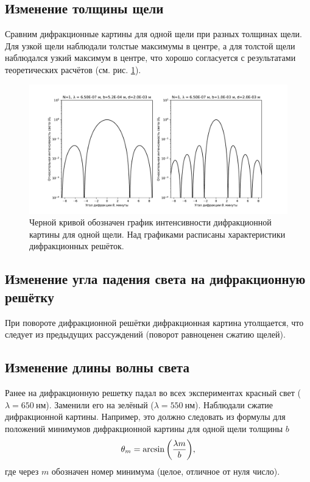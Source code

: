 \documentclass[12pt]{article}
\begin{document}
	\subsection{Изменение толщины щели}
	Сравним дифракционные картины для одной щели при разных толщинах щели. Для узкой щели наблюдали толстые максимумы в центре, а для толстой щели наблюдался узкий максимум в центре, что хорошо согласуется с результатами теоретических расчётов (см. рис. \ref{fig:figure6}).
	\begin{figure}[ht]
		\centering
		\includegraphics[width=0.7\linewidth]{../plots/dif_1_compar_b}
		\caption{Черной кривой обозначен график интенсивности дифракционной картины для одной щели. Над графиками расписаны характеристики дифракционных решёток.}
		\label{fig:figure6}
	\end{figure}

	\subsection{Изменение угла падения света на дифракционную решётку}
	При повороте дифракционной решётки дифракционная картина утолщается, что следует из предыдущих рассуждений (поворот равноценен сжатию щелей).

	\subsection{Изменение длины волны света}
	Ранее на дифракционную решетку падал во всех экспериментах красный свет ($\lambda = 650\ \text{нм}$). Заменили его на зелёный ($\lambda = 550\ \text{нм}$). Наблюдали сжатие дифракционной картины. Например, это должно следовать из формулы для положений минимумов дифракционной картины для одной щели толщины $b$
	\begin{equation}
		\theta_m = \arcsin\qty(\dfrac{\lambda m}{b}),
	\end{equation}
	где через $m$ обозначен номер минимума (целое, отличное от нуля число).
\end{document}
